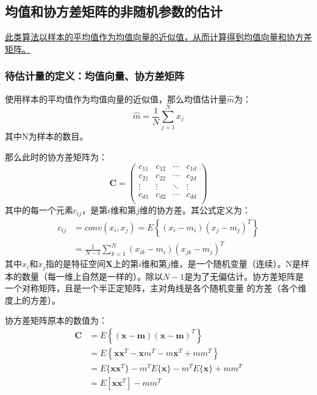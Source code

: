 \documentclass[12pt, letterpaper]{article}
\begin{document}
\subsection{均值和协方差矩阵的非随机参数的估计}
\uline{此类算法以样本的平均值作为均值向量的近似值，从而计算得到均值向量和协方差矩阵。}
\subsubsection*{待估计量的定义：均值向量、协方差矩阵}
使用样本的平均值作为均值向量的近似值，那么均值估计量$\hat{m}$为：
\begin{equation}
\hat{m}=\frac{1}{N}\sum_{j=1}^{N}x_j
\end{equation}
其中N为样本的数目。

那么此时的协方差矩阵为：
\begin{equation}
\mathbf{C} = 
 \left(
 \begin{matrix}
   c_{11} & c_{12} &\cdots & c_{1d} \\
   c_{21} & c_{22} &\cdots & c_{2d} \\
   \vdots & \vdots &\ddots & \vdots \\
   c_{d1} & c_{d2} &\cdots & c_{dd} \\
  \end{matrix}
  \right) 
\end{equation}
其中的每一个元素$c_{ij}$，是第$i$维和第$j$维的协方差。其公式定义为：
\begin{equation}
\begin{aligned}
c_{ij}&=conv(x_i,x_j)=E\left\{ (x_i-m_i)(x_j-m_j)^T\right\} \\
&=\frac{1}{N-1}\sum_{k=1}^{N}(x_{ik}-m_i)(x_{jk}-m_j)^T
\end{aligned}
\end{equation}
其中$x_i$和$x_j$指的是特征空间$\mathbf{X}$上的第$i$维和第$j$维，是一个随机变量（连续）。N是样本的数量（每一维上自然是一样的）。除以$N-1$是为了无偏估计。协方差矩阵是一个对称矩阵，且是一个半正定矩阵，主对角线是各个随机变量 的方差（各个维度上的方差）。

协方差矩阵原本的数值为：
\begin{equation}
\begin{aligned}
\mathbf{C}&=E\left\{ (\mathbf{x}-\mathbf{m})(\mathbf{x}-\mathbf{m})^T\right\}\\
&=E\left\{\mathbf{x}\mathbf{x}^T-\mathbf{x}m^T-m\mathbf{x}^T+mm^T\right\}\\
&=E\{\mathbf{x}\mathbf{x}^T\}-m^TE\{\mathbf{x}\}-m^TE\{\mathbf{x}\}+mm^T\\
&=E[\mathbf{x}\mathbf{x}^T]-mm^T
\end{aligned}
\end{equation}
\end{document}
